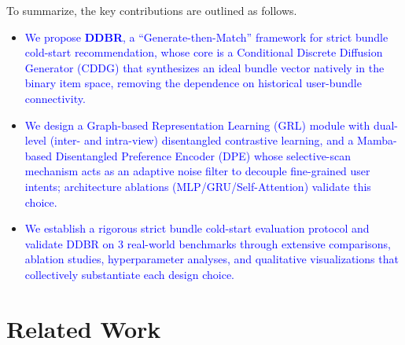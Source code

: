 \documentclass[lettersize,journal]{IEEEtran}
\newcommand{\revise}[1]{\textcolor{blue}{#1}}
\begin{document}
To summarize, the key contributions are outlined as follows.
\begin{itemize}
\item \revise{We propose \textbf{DDBR}, a ``Generate-then-Match'' framework for strict bundle cold-start recommendation, whose core is a Conditional Discrete Diffusion Generator (CDDG) that synthesizes an ideal bundle vector natively in the binary item space, removing the dependence on historical user-bundle connectivity.}
\item \revise{We design a Graph-based Representation Learning (GRL) module with dual-level (inter- and intra-view) disentangled contrastive learning, and a Mamba-based Disentangled Preference Encoder (DPE) whose selective-scan mechanism acts as an adaptive noise filter to decouple fine-grained user intents; architecture ablations (MLP/GRU/Self-Attention) validate this choice.}
\item \revise{We establish a rigorous strict bundle cold-start evaluation protocol and validate DDBR on 3 real-world benchmarks through extensive comparisons, ablation studies, hyperparameter analyses, and qualitative visualizations that collectively substantiate each design choice.}
\end{itemize}


\section{Related Work}
\end{document}
